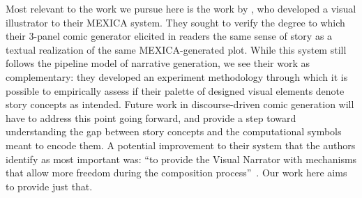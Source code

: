 Most relevant to the work we pursue here is the work by
, who developed a visual illustrator to their
MEXICA system. They sought to verify the degree to which their 3-panel comic 
generator elicited in readers the same sense of story as a textual realization 
of the same MEXICA-generated plot. While this system still follows the pipeline
model of narrative generation, we see their work as complementary: they developed 
an experiment methodology through which it is possible to empirically assess if
their palette of designed visual elements denote story concepts as intended. 
Future work in discourse-driven comic generation will have to address this
point going forward, and \citeauthor{perezyperez2012illustrating} provide a step
toward understanding the gap between story concepts and the computational symbols
meant to encode them. A potential improvement to their system that the authors 
identify as most important was: ``to provide the Visual Narrator with mechanisms
that allow more freedom during the composition 
process''~\cite{perezyperez2012illustrating}. Our work here aims to provide just 
that.
